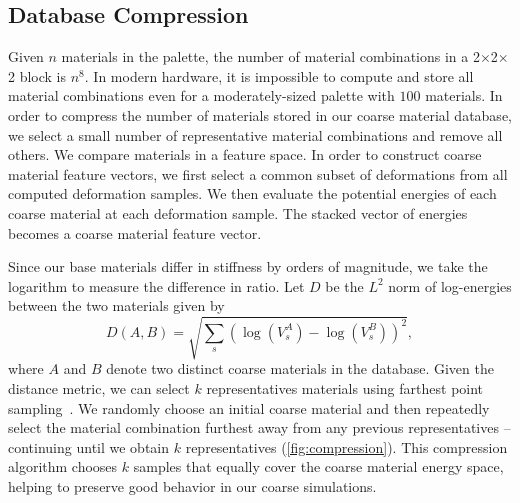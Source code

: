 \subsection{Database Compression}
\label{sec:compression}
Given $n$ materials in the palette, the number of material combinations in a 2$\times$2$\times$2 block is $n^8$. In modern hardware, it is impossible to compute and store all material combinations even for a moderately-sized palette with $100$ materials.
In order to compress the number of materials stored in our coarse material database, we select a small number of representative material combinations and remove all others. We compare materials in a feature space. In order to construct coarse material feature vectors, we first select a common subset of deformations from all computed deformation samples. We then evaluate the potential energies of each coarse material at each deformation sample. The stacked vector of energies becomes a coarse material feature vector. 

Since our base materials differ in stiffness by orders of magnitude, we take the logarithm to measure the difference in ratio.
Let $D$ be the $L^2$ norm of log-energies between the two materials given by
\begin{equation}
D(A,B)=\sqrt{\sum_s (\log(V^{A}_{s})-\log(V^{B}_{s}))^2},
\end{equation} where $A$ and $B$ denote two distinct coarse materials in the database. 
Given the distance metric, we can select $k$ representatives materials using farthest point sampling~\cite{eldar1997farthest}. We randomly choose an initial coarse material and then repeatedly select the material combination furthest away from any previous representatives -- continuing until we obtain $k$ representatives (\autoref{fig:compression}). This compression algorithm chooses $k$ samples that equally cover the coarse material energy space, helping to preserve good behavior in our coarse simulations. 
